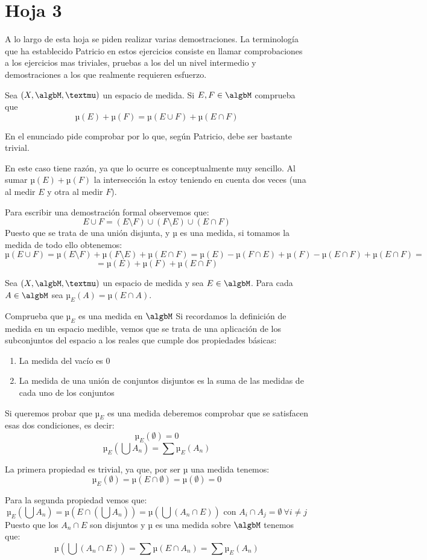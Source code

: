 \section{Hoja 3}
A lo largo de esta hoja se piden realizar varias demostraciones. La terminología que ha establecido Patricio en estos ejercicios consiste en llamar comprobaciones a los ejercicios mas triviales, pruebas a los del un nivel intermedio y demostraciones a los que realmente requieren esfuerzo.

\begin{problem}
Sea $(X, \algbM, µ)$ un espacio de medida. Si $E,F \in \algbM$ comprueba que
\[µ(E)+µ(F)=µ(E\cup F) + µ (E\cap F)\]

\solution
En el enunciado pide comprobar por lo que, según Patricio, debe ser bastante trivial.

En este caso tiene razón, ya que lo ocurre es conceptualmente muy sencillo. Al sumar $µ(E)+µ(F)$ la intersección la estoy teniendo en cuenta dos veces (una al medir $E$ y otra al medir $F$).

Para escribir una demostración formal observemos que:
\[E \cup F = (E \setminus F) \cup (F\setminus E) \cup (E \cap F)\]
Puesto que se trata de una unión disjunta, y µ es una medida, si tomamos la medida de todo ello obtenemos:
\[µ(E \cup F) = µ(E \setminus F) + µ(F\setminus E) + µ(E \cap F) = µ(E)-µ(F\cap E)+µ(F)-µ(E \cap F)+µ(E \cap F) =\]
\[= µ(E) + µ (F) +µ (E \cap F)\]
\end{problem}

\begin{problem}
Sea $(X, \algbM, µ)$ un espacio de medida y sea $E \in \algbM$. Para cada $A \in \algbM$ sea $µ_E(A)=µ(E\cap A)$.

Comprueba que $µ_E$ es una medida en $\algbM$
\solution
Si recordamos la definición de medida en un espacio medible, vemos que se trata de una aplicación de los subconjuntos del espacio a los reales que cumple dos propiedades básicas:
\begin{enumerate}
\item La medida del vacío es 0
\item La medida de una unión de conjuntos disjuntos es la suma de las medidas de cada uno de los conjuntos
\end{enumerate}

Si queremos probar que $µ_E$ es una medida deberemos comprobar que se satisfacen esas dos condiciones, es decir:
\[µ_E(\emptyset) = 0\]
\[µ_E(\bigcup A_n) = \sum µ_E(A_n)\]

La primera propiedad es trivial, ya que, por ser µ una medida tenemos:
\[µ_E(\emptyset)=µ(E \cap \emptyset)=µ(\emptyset)=0\]

Para la segunda propiedad vemos que:
\[µ_E(\bigcup A_n)=µ(E \cap (\bigcup A_n)) = µ(\bigcup(A_n \cap E)) \text{ con } A_i\cap A_j = \emptyset \ \forall i\neq j\]
Puesto que los $A_n \cap E$ son disjuntos y $µ$ es una medida sobre $\algbM$ tenemos que:
\[µ(\bigcup(A_n \cap E))=\sum µ(E \cap A_n) = \sum µ_E(A_n)\]

\end{problem}

